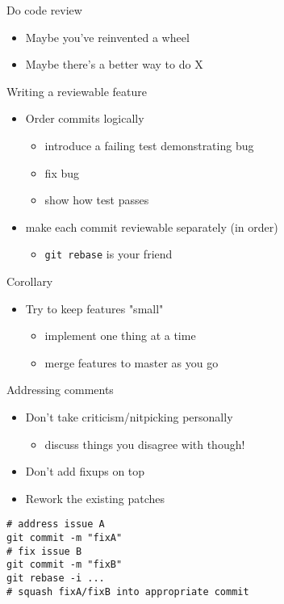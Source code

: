 \documentclass[presentation]{beamer}
\begin{document}
\begin{frame}[label=sec-2-1]{Do code review}
\begin{itemize}
\item Maybe you've reinvented a wheel
\item Maybe there's a better way to do X
\end{itemize}
\end{frame}
\begin{frame}[fragile,label=sec-2-2]{Writing a reviewable feature}
 \begin{itemize}
\item Order commits logically
\begin{itemize}
\item introduce a failing test demonstrating bug
\item fix bug
\item show how test passes
\end{itemize}
\item make each commit reviewable separately (in order)
\begin{itemize}
\item \texttt{git rebase} is your friend
\end{itemize}
\end{itemize}
\end{frame}
\begin{frame}[label=sec-2-3]{Corollary}
\begin{itemize}
\item Try to keep features "small"
\begin{itemize}
\item implement one thing at a time
\item merge features to master as you go
\end{itemize}
\end{itemize}
\end{frame}
\begin{frame}[fragile,label=sec-2-4]{Addressing comments}
 \begin{itemize}
\item Don't take criticism/nitpicking personally
\begin{itemize}
\item discuss things you disagree with though!
\end{itemize}
\item Don't add fixups on top
\item Rework the existing patches
\end{itemize}
\begin{verbatim}
# address issue A
git commit -m "fixA"
# fix issue B
git commit -m "fixB"
git rebase -i ...
# squash fixA/fixB into appropriate commit
\end{verbatim}
\end{frame}
\end{document}
